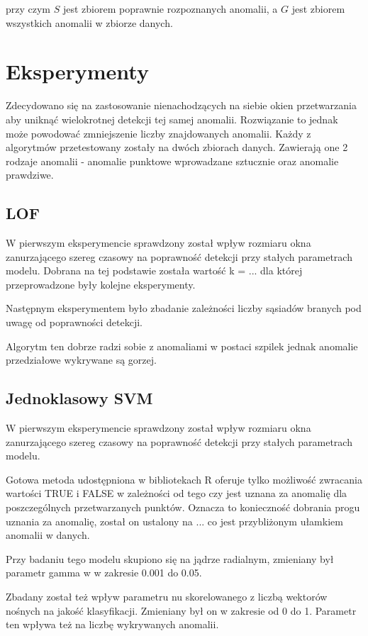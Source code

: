\documentclass{article}
\begin{document}
przy czym \(S\) jest zbiorem poprawnie rozpoznanych anomalii, a \(G\)
jest zbiorem wszystkich anomalii w zbiorze danych.


\section{Eksperymenty}
Zdecydowano się na zastosowanie nienachodzących na siebie okien przetwarzania aby uniknąć wielokrotnej detekcji tej samej anomalii. Rozwiązanie to jednak może powodować zmniejszenie liczby znajdowanych anomalii. Każdy z algorytmów przetestowany zostały na dwóch zbiorach danych. Zawierają one 2 rodzaje anomalii - anomalie punktowe wprowadzane sztucznie oraz anomalie prawdziwe. 

\subsection{LOF}
W pierwszym eksperymencie sprawdzony został wpływ rozmiaru okna zanurzającego szereg czasowy na poprawność detekcji przy stałych parametrach modelu. Dobrana na tej podstawie została wartość k = ... dla której przeprowadzone były kolejne eksperymenty. 

Następnym eksperymentem było zbadanie zależności liczby sąsiadów branych pod uwagę od poprawności detekcji. 

Algorytm ten dobrze radzi sobie z anomaliami w postaci szpilek jednak anomalie przedziałowe wykrywane są gorzej. 


\subsection{Jednoklasowy SVM}
W pierwszym eksperymencie sprawdzony został wpływ rozmiaru okna zanurzającego szereg czasowy na poprawność detekcji przy stałych parametrach modelu. 

Gotowa metoda udostępniona w bibliotekach R oferuje tylko możliwość zwracania wartości TRUE i FALSE w zależności od tego czy jest uznana za anomalię dla poszczególnych przetwarzanych punktów. Oznacza to konieczność dobrania progu uznania za anomalię, został on ustalony na ... co jest przybliżonym ułamkiem anomalii w danych. 

Przy badaniu tego modelu skupiono się na jądrze radialnym, zmieniany był parametr gamma w w zakresie 0.001 do 0.05. 

Zbadany został też wpływ parametru nu skorelowanego z liczbą wektorów nośnych na jakość klasyfikacji. Zmieniany był on w zakresie od 0 do 1. Parametr ten wpływa też na liczbę wykrywanych anomalii.   
\end{document}
